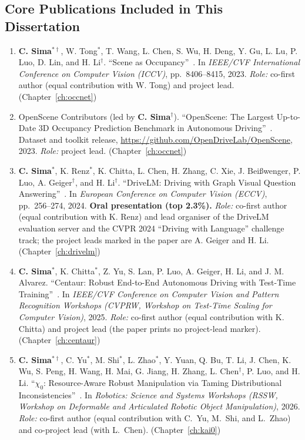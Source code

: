 \subsection*{Core Publications Included in This Dissertation}

\begin{enumerate}[label={\arabic*.}, leftmargin=2.4em, labelwidth=1.8em, labelsep=0.6em, align=left, itemsep=4pt]
  \item \textbf{C. Sima}$^{*\dagger}$, W. Tong$^{*}$, T. Wang, L. Chen, S. Wu, H. Deng, Y. Gu, L. Lu, P. Luo, D. Lin, and H. Li$^{\dagger}$.
        ``Scene as Occupancy''~\cite{sima2023occnet}.
        In \emph{IEEE/CVF International Conference on Computer Vision (ICCV)}, pp.~8406--8415, 2023.
        \emph{Role:} co-first author (equal contribution with W. Tong) and project lead.
        \hfill (Chapter~\ref{ch:occnet})
  \item OpenScene Contributors (led by \textbf{C. Sima}$^{\dagger}$).
        ``OpenScene: The Largest Up-to-Date 3D Occupancy Prediction Benchmark in Autonomous Driving''~\cite{sima2023openscene}.
        Dataset and toolkit release, \url{https://github.com/OpenDriveLab/OpenScene}, 2023.
        \emph{Role:} project lead.
        \hfill (Chapter~\ref{ch:occnet})
  \item \textbf{C. Sima}$^{*}$, K. Renz$^{*}$, K. Chitta, L. Chen, H. Zhang, C. Xie, J. Bei{\ss}wenger, P. Luo, A. Geiger$^{\dagger}$, and H. Li$^{\dagger}$.
        ``DriveLM: Driving with Graph Visual Question Answering''~\cite{sima2024drivelm}.
        In \emph{European Conference on Computer Vision (ECCV)}, pp.~256--274, 2024. \textbf{Oral presentation (top 2.3\%).}
        \emph{Role:} co-first author (equal contribution with K. Renz) and lead organiser of the DriveLM evaluation server and the CVPR 2024 ``Driving with Language'' challenge track; the project leads marked in the paper are A. Geiger and H. Li.
        \hfill (Chapter~\ref{ch:drivelm})
  \item \textbf{C. Sima}$^{*}$, K. Chitta$^{*}$, Z. Yu, S. Lan, P. Luo, A. Geiger, H. Li, and J. M. Alvarez.
        ``Centaur: Robust End-to-End Autonomous Driving with Test-Time Training''~\cite{sima2024centaur}.
        In \emph{IEEE/CVF Conference on Computer Vision and Pattern Recognition Workshops (CVPRW, Workshop on Test-Time Scaling for Computer Vision)}, 2025.
        \emph{Role:} co-first author (equal contribution with K. Chitta) and project lead (the paper prints no project-lead marker).
        \hfill (Chapter~\ref{ch:centaur})
  \item \textbf{C. Sima}$^{*\dagger}$, C. Yu$^{*}$, M. Shi$^{*}$, L. Zhao$^{*}$, Y. Yuan, Q. Bu, T. Li, J. Chen, K. Wu, S. Peng, H. Wang, H. Mai, G. Jiang, H. Zhang, L. Chen$^{\dagger}$, P. Luo, and H. Li.
        ``$\chi_0$: Resource-Aware Robust Manipulation via Taming Distributional Inconsistencies''~\cite{sima2026kai0}.
        In \emph{Robotics: Science and Systems Workshops (RSSW, Workshop on Deformable and Articulated Robotic Object Manipulation)}, 2026.
        \emph{Role:} co-first author (equal contribution with C.~Yu, M.~Shi, and L.~Zhao) and co-project lead (with L.~Chen).
        \hfill (Chapter~\ref{ch:kai0})
\end{enumerate}

